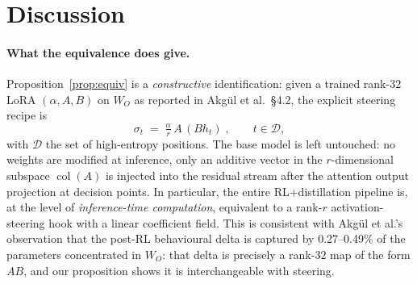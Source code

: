 \documentclass[11pt]{article}
\begin{document}
\section*{Discussion}

\paragraph{What the equivalence does give.}
Proposition~\ref{prop:equiv} is a \emph{constructive} identification: given a trained rank-$32$ LoRA $(\alpha, A, B)$ on $W_O$ as reported in Akg\"{u}l et al.\ \S 4.2, the explicit steering recipe is
\[
\boxed{\;\sigma_t \;=\; \tfrac{\alpha}{r}\, A\, (B h_t)\;,\qquad t \in \mathcal{D},\;}
\]
with $\mathcal{D}$ the set of high-entropy positions. The base model is left untouched: no weights are modified at inference, only an additive vector in the $r$-dimensional subspace $\operatorname{col}(A)$ is injected into the residual stream after the attention output projection at decision points. In particular, the entire RL+distillation pipeline is, at the level of \emph{inference-time computation}, equivalent to a rank-$r$ activation-steering hook with a linear coefficient field. This is consistent with Akg\"{u}l et al.'s observation that the post-RL behavioural delta is captured by 0.27--0.49\% of the parameters concentrated in $W_O$: that delta is precisely a rank-$32$ map of the form $A B$, and our proposition shows it is interchangeable with steering.
\end{document}
